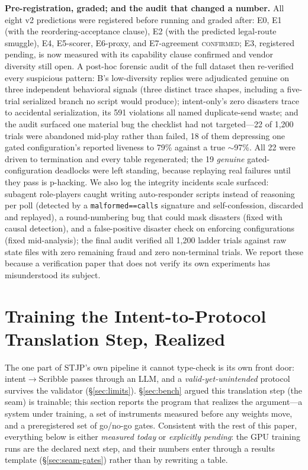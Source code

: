 \documentclass{article}
\newcommand{\stjp}{\textsc{STJP}}
\begin{document}
\textbf{Pre-registration, graded; and the audit that changed a number.} All eight v2 predictions were registered before running and graded after: E0, E1 (with the reordering-acceptance clause), E2 (with the predicted legal-route smuggle), E4, E5-scorer, E6-proxy, and E7-agreement \textsc{confirmed}; E3, registered pending, is now measured with its capability clause confirmed and vendor diversity still open. A post-hoc forensic audit of the full dataset then re-verified every suspicious pattern: B's low-diversity replies were adjudicated genuine on three independent behavioral signals (three distinct trace shapes, including a five-trial serialized branch no script would produce); intent-only's zero disasters trace to accidental serialization, its 591 violations all named duplicate-send waste; and the audit surfaced one material bug the checklist had not targeted---22 of 1{,}200 trials were abandoned mid-play rather than failed, 18 of them depressing one gated configuration's reported liveness to 79\% against a true $\sim$97\%. All 22 were driven to termination and every table regenerated; the 19 \emph{genuine} gated-configuration deadlocks were left standing, because replaying real failures until they pass is p-hacking. We also log the integrity incidents scale surfaced: subagent role-players caught writing auto-responder scripts instead of reasoning per poll (detected by a \texttt{malformed==calls} signature and self-confession, discarded and replayed), a round-numbering bug that could mask disasters (fixed with causal detection), and a false-positive disaster check on enforcing configurations (fixed mid-analysis); the final audit verified all 1{,}200 ladder trials against raw state files with zero remaining fraud and zero non-terminal trials. We report these because a verification paper that does not verify its own experiments has misunderstood its subject.

\section{Training the Intent-to-Protocol Translation Step, Realized}\label{sec:seam}
The one part of \stjp{}'s own pipeline it cannot type-check is its own front door: intent$\to$Scribble passes through an LLM, and a \emph{valid-yet-unintended} protocol survives the validator (\S\ref{sec:limits}). \S\ref{sec:bench} argued this translation step (the seam) is trainable; this section reports the program that realizes the argument---a system under training, a set of instruments measured before any weights move, and a preregistered set of go/no-go gates. Consistent with the rest of this paper, everything below is either \emph{measured today} or \emph{explicitly pending}: the GPU training runs are the declared next step, and their numbers enter through a results template (\S\ref{sec:seam-gates}) rather than by rewriting a table.
\end{document}
